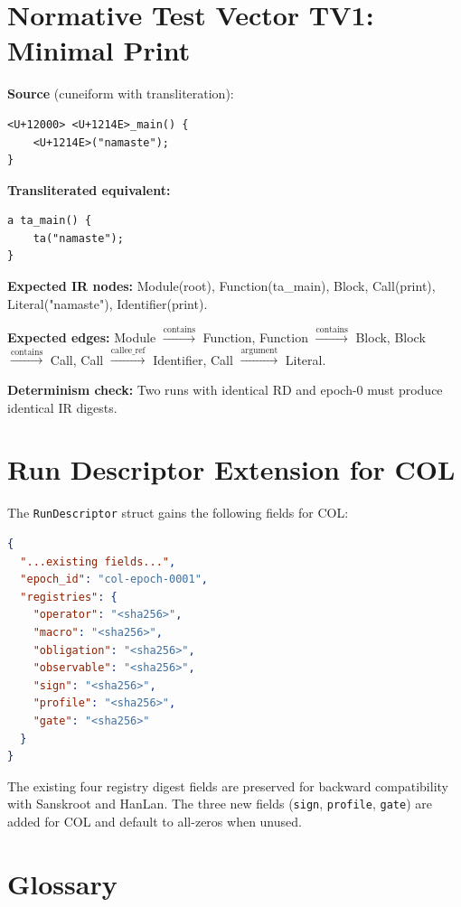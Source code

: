 \documentclass[11pt,a4paper,twoside]{article}
\theoremstyle{definition}
\theoremstyle{remark}
\begin{document}
\section{Normative Test Vector TV1: Minimal Print}
\label{app:tv1}

\textbf{Source} (cuneiform with transliteration):
\begin{lstlisting}
<U+12000> <U+1214E>_main() {
    <U+1214E>("namaste");
}
\end{lstlisting}

\textbf{Transliterated equivalent:}
\begin{lstlisting}
a ta_main() {
    ta("namaste");
}
\end{lstlisting}

\textbf{Expected IR nodes:} Module(root), Function(ta\_main), Block, Call(print), Literal("namaste"), Identifier(print).

\textbf{Expected edges:} Module $\xrightarrow{\text{contains}}$ Function, Function $\xrightarrow{\text{contains}}$ Block, Block $\xrightarrow{\text{contains}}$ Call, Call $\xrightarrow{\text{callee\_ref}}$ Identifier, Call $\xrightarrow{\text{argument}}$ Literal.

\textbf{Determinism check:} Two runs with identical RD and epoch-0 must produce identical IR digests.

\section{Run Descriptor Extension for COL}
\label{app:rd-extension}

The \texttt{RunDescriptor} struct gains the following fields for COL:

\begin{lstlisting}[language=JSON]
{
  "...existing fields...",
  "epoch_id": "col-epoch-0001",
  "registries": {
    "operator": "<sha256>",
    "macro": "<sha256>",
    "obligation": "<sha256>",
    "observable": "<sha256>",
    "sign": "<sha256>",
    "profile": "<sha256>",
    "gate": "<sha256>"
  }
}
\end{lstlisting}

The existing four registry digest fields are preserved for backward compatibility with Sanskroot and HanLan. The three new fields (\texttt{sign}, \texttt{profile}, \texttt{gate}) are added for COL and default to all-zeros when unused.


\section{Glossary}
\label{app:glossary}
\end{document}
